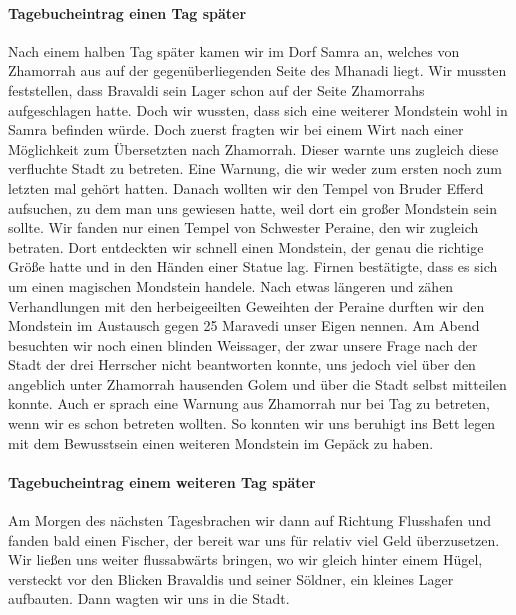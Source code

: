 \paragraph{Tagebucheintrag einen Tag später}
Nach einem halben Tag später kamen wir im Dorf Samra an, welches von Zhamorrah aus auf der gegenüberliegenden Seite des Mhanadi liegt. Wir mussten feststellen, dass Bravaldi sein Lager schon auf der Seite Zhamorrahs aufgeschlagen hatte. Doch wir wussten, dass sich eine weiterer Mondstein wohl in Samra befinden würde. Doch zuerst fragten wir bei einem Wirt nach einer Möglichkeit zum Übersetzten nach Zhamorrah. Dieser warnte uns zugleich diese verfluchte Stadt zu betreten. Eine Warnung, die wir weder zum ersten noch zum letzten mal gehört hatten. Danach wollten wir den Tempel von Bruder Efferd aufsuchen, zu dem man uns gewiesen hatte, weil dort ein großer Mondstein sein sollte. Wir fanden nur einen Tempel von Schwester Peraine, den wir zugleich betraten. Dort entdeckten wir schnell einen Mondstein, der genau die richtige Größe hatte und in den Händen einer Statue lag. Firnen bestätigte, dass es sich um einen magischen Mondstein handele. Nach etwas längeren und zähen Verhandlungen mit den herbeigeeilten Geweihten der Peraine durften wir den Mondstein im Austausch gegen 25 Maravedi unser Eigen nennen. Am Abend besuchten wir noch einen blinden Weissager, der zwar unsere Frage nach der Stadt der drei Herrscher nicht beantworten konnte, uns jedoch viel über den angeblich unter Zhamorrah hausenden Golem und über die Stadt selbst mitteilen konnte. Auch er sprach eine Warnung aus Zhamorrah nur bei Tag zu betreten, wenn wir es schon betreten wollten. So konnten wir uns beruhigt ins Bett legen mit dem Bewusstsein einen weiteren Mondstein im Gepäck zu haben.

\paragraph{Tagebucheintrag einem weiteren Tag später}
Am Morgen des nächsten Tagesbrachen wir dann auf Richtung Flusshafen und fanden bald einen Fischer, der bereit war uns für relativ viel Geld überzusetzen. Wir ließen uns weiter flussabwärts bringen, wo wir gleich hinter einem Hügel, versteckt vor den Blicken Bravaldis und seiner Söldner, ein kleines Lager aufbauten. Dann wagten wir uns in die Stadt.

